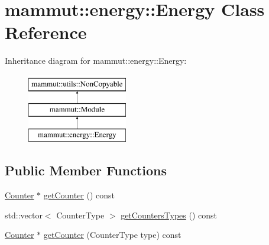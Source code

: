 \hypertarget{classmammut_1_1energy_1_1Energy}{\section{mammut\-:\-:energy\-:\-:Energy Class Reference}
\label{classmammut_1_1energy_1_1Energy}
}
Inheritance diagram for mammut\-:\-:energy\-:\-:Energy\-:\begin{figure}[H]
\begin{center}
\leavevmode
\includegraphics[height=3.000000cm]{classmammut_1_1energy_1_1Energy}
\end{center}
\end{figure}
\subsection*{Public Member Functions}
\begin{DoxyCompactItemize}
\item 
\hyperlink{classmammut_1_1energy_1_1Counter}{Counter} $\ast$ \hyperlink{classmammut_1_1energy_1_1Energy_a5f25777d5bb8e18933d732d52a45ce50}{get\-Counter} () const 
\item 
std\-::vector$<$ Counter\-Type $>$ \hyperlink{classmammut_1_1energy_1_1Energy_a2ef397565802ed9efbe54d782c6917db}{get\-Counters\-Types} () const 
\item 
\hyperlink{classmammut_1_1energy_1_1Counter}{Counter} $\ast$ \hyperlink{classmammut_1_1energy_1_1Energy_a9989f5efbf526e2a5a7bd71ef32c0245}{get\-Counter} (Counter\-Type type) const 
\end{DoxyCompactItemize}


